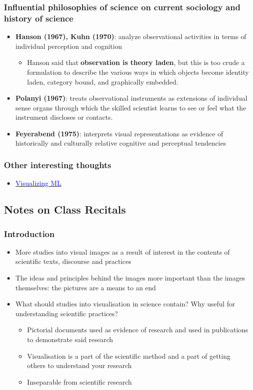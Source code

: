 \documentclass[a4paper]{article}
\begin{document}
\subsubsection{Influential philosophies of science on current sociology and history of science}
\begin{itemize}
	\item \textbf{Hanson (1967), Kuhn (1970)}: analyze observational activities in terms of individual perception and cognition
	\begin{itemize}[label=$\circ$]
		\item Hanson said that \textbf{observation is theory laden}, but this is too crude a formulation to describe the various ways in which objects become identity laden, category bound, and graphically embedded.
	\end{itemize}
	\item \textbf{Polanyi (1967)}: treats observational instruments as extensions of individual sense organs through which the skilled scientist learns to see or feel what the instrument discloses or contacts.
	\item \textbf{Feyerabend (1975)}: interprets visual representations as evidence of historically and culturally relative cognitive and perceptual tendencies
\end{itemize}
\subsubsection{Other interesting thoughts}
\begin{itemize}
	\item \href{http://jalammar.github.io/about/}{\textcolor{blue}{Visualizing ML}}
\end{itemize}
\subsection{Notes on Class Recitals}
\subsubsection{Introduction}
\begin{itemize}
	\item More studies into visual images as a result of interest in the contents of scientific texts, discourse and practices
	\item The ideas and principles behind the images more important than the images themselves: the pictures are a means to an end
	\item What should studies into visualisation in science contain? Why useful for understanding scientific practices?
	\begin{itemize}[label=$\circ$]
		\item Pictorial documents used as evidence of research and used in publications to demonstrate said research
		\item Visualisation is a part of the scientific method and a part of getting others to understand your research
		\item Inseparable from scientific research
	\end{itemize}
\end{itemize}
\end{document}

